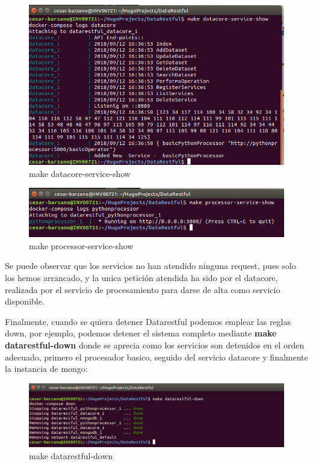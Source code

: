 \documentclass[a4paper,11pt]{book}
\begin{document}
\begin{figure}[H]  
\centering 
\includegraphics[scale=0.35]{imagenes/datacore-service-show.png}
\caption{ make datacore-service-show }  
\end{figure} 


\begin{figure}[H]  
\centering 
\includegraphics[scale=0.35]{imagenes/processor-service-show.png}
\caption{ make processor-service-show }  
\end{figure} 

Se puede observar que los servicios no han atendido ninguna request, pues solo los hemos arrancado, y la unica petición atendida ha sido por el datacore, realizada por el servicio de procesamiento para darse de alta como servicio disponible. 

Finalmente, cuando se quiera detener Datarestful podemos emplear las reglas down, por ejemplo, podemos detener el sistema completo mediante \textbf{make datarestful-down}  donde se aprecia como los servicios son detenidos en el orden adecuado, primero el procesador basico, seguido del servicio datacore y finalmente la instancia de mongo: 

\begin{figure}[H]  
\centering 
\includegraphics[scale=0.35]{imagenes/datarestful-down.png}
\caption{ make datarestful-down}  
\end{figure} 
\end{document}
